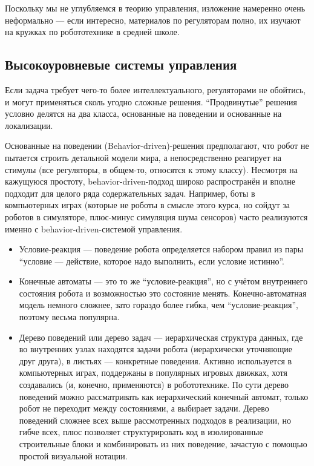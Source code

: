 \documentclass{../../text-style}
\begin{document}
Поскольку мы не углубляемся в теорию управления, изложение намеренно очень неформально --- если интересно, материалов по регуляторам полно, их изучают на кружках по робототехнике в средней школе.

\subsection{Высокоуровневые системы управления}

Если задача требует чего-то более интеллектуального, регуляторами не обойтись, и могут применяться сколь угодно сложные решения. 
\enquote{Продвинутые} решения условно делятся на два класса, основанные на поведении и основанные на локализации.

Основанные на поведении (Behavior-driven)-решения предполагают, что робот не пытается строить детальной модели мира, а непосредственно реагирует на стимулы (все регуляторы, в общем-то, относятся к этому классу).
Несмотря на кажущуюся простоту, behavior-driven-подход широко распространён и вполне подходит для целого ряда содержательных задач.
Например, боты в компьютерных играх (которые не роботы в смысле этого курса, но сойдут за роботов в симуляторе, плюс-минус симуляция шума сенсоров) часто реализуются именно с behavior-driven-системой управления.

\begin{itemize}
    \item Условие-реакция --- поведение робота определяется набором правил из пары \enquote{условие --- действие, которое надо выполнить, если условие истинно}.
    \item Конечные автоматы --- это то же \enquote{условие-реакция}, но с учётом внутреннего состояния робота и возможностью это состояние менять.
        Конечно-автоматная модель немного сложнее, зато гораздо более гибка, чем \enquote{условие-реакция}, поэтому весьма популярна.
    \item Дерево поведений или дерево задач --- иерархическая структура данных, где во внутренних узлах находятся задачи робота (иерархически уточняющие друг друга), в листьях --- конкретные поведения.
        Активно используется в компьютерных играх, поддержаны в популярных игровых движках, хотя создавались (и, конечно, применяются) в робототехнике.
        По сути дерево поведений можно рассматривать как иерархический конечный автомат, только робот не переходит между состояниями, а выбирает задачи.
        Дерево поведений сложнее всех выше рассмотренных подходов в реализации, но гибче всех, плюс позволяет структурировать код в изолированные строительные блоки и комбинировать из них поведение, зачастую с помощью простой визуальной нотации.
\end{itemize}
\end{document}
